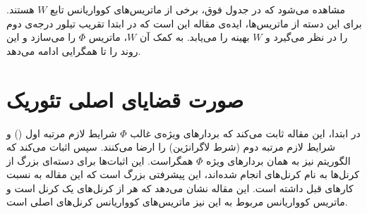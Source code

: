 \documentclass[a4paper]{article}
\begin{document}
	مشاهده می‌شود که در جدول فوق، برخی از ماتریس‌های کوواریانس تابع $W$ هستند. برای این دسته از ماتریس‌ها، ایده‌‌ی ‌مقاله این است که در ابتدا تقریب تیلور درجه‌ی دوم را در نظر می‌گیرد و $W$ بهینه را می‌یابد. به کمک آن $W$، ماتریس 
	$\Phi$
	را می‌سازد و این روند را تا همگرایی ادامه می‌دهد.
	
	
	\section{صورت قضایای اصلی تئوریک}
	در ابتدا، این  مقاله ثابت می‌کند که بردار‌های ویژه‌ی غالب 
	$\Phi$
	شرایط لازم مرتبه اول ()
	و شرایط لازم مرتبه دوم (شرط لاگرانژین) را ارضا می‌کنند. سپس اثبات می‌کند که الگوریتم 
	نیز به همان بردار‌های ویژه‌
	$\Phi$
	همگراست. این اثبات‌ها برای دسته‌ای بزرگ از کرنل‌ها به نام کرنل‌های 
	انجام شده‌‌اند، این پیشرفتی بزرگ است که این مقاله به نسبت کارهای قبل داشته است.  این مقاله نشان می‌دهد که هر 
	از کرنل‌های 
	یک کرنل 
	است و ماتریس کوواریانس مربوط به این  نیز 
	ماتریس‌های کوواریانس کرنل‌های اصلی است.
	
		\begin{latin}
		
		
	\end{latin}
	
	
	\pagebreak
	
	
\end{document}
